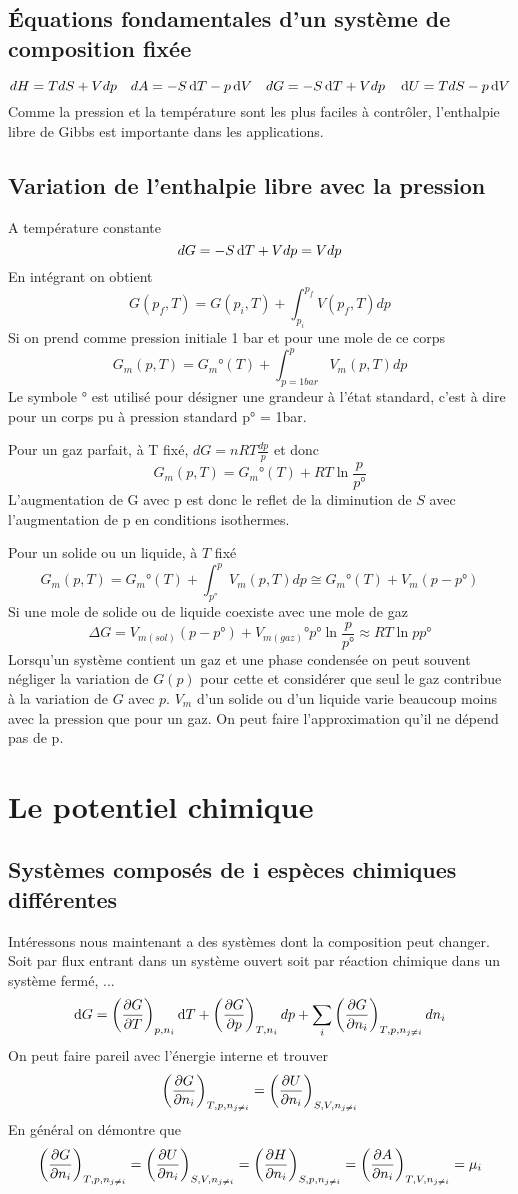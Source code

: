 \subsection{Équations fondamentales d'un système de composition fixée}
\[ dH = TdS+Vdp \quad dA = -S\operatorname{d}\! T -p\operatorname{d}\! V \quad
dG = -S\operatorname{d}\! T +Vdp \quad \operatorname{d}\! U = TdS-p\operatorname{d}\! V \]
Comme la pression et la température sont les plus faciles à contrôler,
l'enthalpie libre de Gibbs est importante dans les applications.

\subsection{Variation de l'enthalpie libre avec la pression}
A température constante
\[ dG = -S\operatorname{d}\! T+Vdp = Vdp \]
En intégrant on obtient
\[ G(p_f,T) = G(p_i,T)+\int_{p_i}^{p_f}V(p_f,T)dp \]
Si on prend comme pression initiale 1 bar et pour une mole de ce corps
\[ G_m(p,T) = G_m°(T)+\int_{p = 1bar}^{p}V_m(p,T)dp \]
Le symbole ° est utilisé pour désigner une grandeur à l'état standard,
c'est à dire pour un corps pu à pression standard p° = 1bar.

Pour un gaz parfait, à T fixé, $dG = nRT\frac{dp}p$ et donc
\[ G_m(p,T) = G_m°(T)+RT \ln \frac {p}{p°} \]
L'augmentation de G avec p est donc le reflet de la diminution de $S$
avec l'augmentation de p en conditions isothermes.

Pour un solide ou un liquide, à $T$ fixé
\[ G_m(p,T) = G_m°(T)+\int_{p°}^{p}V_m(p,T)dp \cong G_m°(T)+V_m(p-p°) \]
Si une mole de solide ou de liquide coexiste avec une mole de gaz
\[ \Delta G =
V_{m(sol)}(p-p°)+V_{m(gaz)}°p°\ln \frac{p}{p°} \approx RT \ln {p}{p°} \]
Lorsqu'un système contient un gaz et une phase condensée
on peut souvent négliger la variation de $G(p)$ pour cette et
considérer que seul le gaz contribue à la variation de $G$ avec $p$.
$V_m$ d'un solide ou d'un liquide varie beaucoup
moins avec la pression que pour un gaz.
On peut faire l'approximation qu'il ne dépend pas de p.

\section{Le potentiel chimique}
\subsection{Systèmes composés de i espèces chimiques différentes}
Intéressons nous maintenant a des systèmes dont la composition peut changer.
Soit par flux entrant dans un système ouvert
soit par réaction chimique dans un système fermé, ...
\[ \operatorname{d}\! G = \left(\frac{\partial G}{\partial T}\right)_{p,n_i}\operatorname{d}\! T +
\left(\frac{\partial G}{\partial p}\right)_{T,n_i}dp +
\sum_i \left(\frac{\partial G}{\partial n_i}\right)_{T,p,n_{j\neq i}}dn_i \]
On peut faire pareil avec l'énergie interne et trouver
\[ \left(\frac{\partial G}{\partial n_i}\right)_{T,p,n_{j\neq i}} =
\left(\frac{\partial U}{\partial n_i}\right)_{S,V,n_{j\neq i}} \]
En général on démontre que
\[ \left(\frac{\partial G}{\partial n_i}\right)_{T,p,n_{j\neq i}} =
\left(\frac{\partial U}{\partial n_i}\right)_{S,V,n_{j\neq i}} =
\left(\frac{\partial H}{\partial n_i}\right)_{S,p,n_{j\neq i}} =
\left(\frac{\partial A}{\partial n_i}\right)_{T,V,n_{j\neq i}} = \mu_i \]

